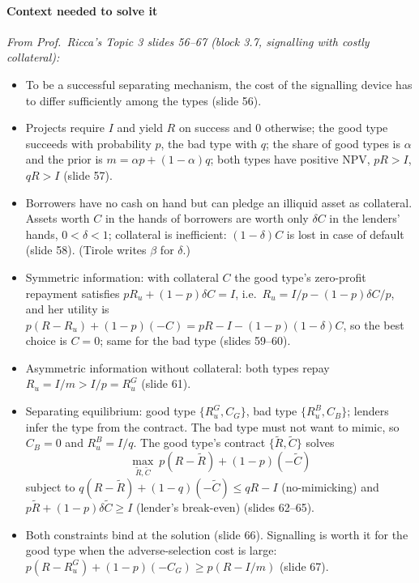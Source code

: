 \documentclass[11pt,a4paper]{article}
\providecommand{\tightlist}{\setlength{\itemsep}{0pt}\setlength{\parskip}{0pt}}
\begin{document}
\paragraph{Context needed to solve it}

\emph{From Prof.~Ricca's Topic 3 slides 56--67 (block 3.7, signalling with costly collateral):}

\begin{itemize}
\tightlist
\item
  To be a successful separating mechanism, the cost of the signalling device has to differ
  sufficiently among the types (slide 56).
\item
  Projects require \(I\) and yield \(R\) on success and 0 otherwise; the good type succeeds with
  probability \(p\), the bad type with \(q\); the share of good types is \(\alpha\) and the prior is
  \(m = \alpha p + (1 - \alpha)q\); both types have positive NPV, \(pR > I\), \(qR > I\) (slide 57).
\item
  Borrowers have no cash on hand but can pledge an illiquid asset as collateral. Assets worth \(C\)
  in the hands of borrowers are worth only \(\delta C\) in the lenders' hands, \(0 < \delta < 1\);
  collateral is inefficient: \((1 - \delta)C\) is lost in case of default (slide 58). (Tirole writes
  \(\beta\) for \(\delta\).)
\item
  Symmetric information: with collateral \(C\) the good type's zero-profit repayment satisfies
  \(pR_u + (1 - p)\delta C = I\), i.e.~\(R_u = I/p - (1 - p)\delta C/p\), and her utility is
  \(p(R - R_u) + (1 - p)(-C) = pR - I - (1 - p)(1 - \delta)C\), so the best choice is \(C = 0\);
  same for the bad type (slides 59--60).
\item
  Asymmetric information without collateral: both types repay \(R_u = I/m > I/p = R_u^G\) (slide
  61).
\item
  Separating equilibrium: good type \(\{R_u^G, C_G\}\), bad type \(\{R_u^B, C_B\}\); lenders infer
  the type from the contract. The bad type must not want to mimic, so \(C_B = 0\) and
  \(R_u^B = I/q\). The good type's contract \(\{\tilde R, \tilde C\}\) solves
  \[\max_{\tilde R, \tilde C}\ p(R - \tilde R) + (1 - p)(-\tilde C)\] subject to
  \(q(R - \tilde R) + (1 - q)(-\tilde C) \le qR - I\) (no-mimicking) and
  \(p\tilde R + (1 - p)\delta\tilde C \ge I\) (lender's break-even) (slides 62--65).
\item
  Both constraints bind at the solution (slide 66). Signalling is worth it for the good type when
  the adverse-selection cost is large: \(p(R - R_u^G) + (1 - p)(-C_G) \ge p(R - I/m)\) (slide 67).
\end{itemize}
\end{document}
